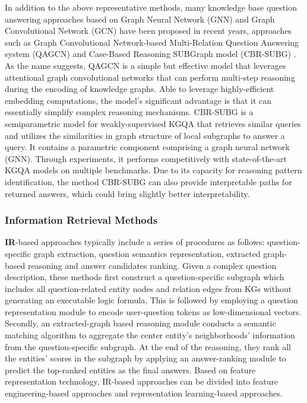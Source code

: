 \documentclass[pdflatex,sn-mathphys]{sn-jnl}%
\theoremstyle{thmstyleone}%
\theoremstyle{thmstyletwo}%
\theoremstyle{thmstylethree}%
\begin{document}
In addition to the above representative methods, many knowledge base question answering approaches based on Graph Neural Network (GNN) \cite{linetal} and Graph Convolutional Network (GCN) \cite{QCNpaper} have been proposed in recent years, approaches such as Graph Convolutional Network-based Multi-Relation Question Answering system (QAGCN) \cite{wangQAGCN} and Case-Based Reasoning SUBGraph model (CBR-SUBG) \cite{pmlrv162das22a}. As the name suggests, QAGCN is a simple but effective model that leverages attentional graph convolutional networks that can perform multi-step reasoning during the encoding of knowledge graphs. Able to leverage highly-efficient embedding computations, the model's significant advantage is that it can essentially simplify complex reasoning mechanisms. CBR-SUBG is a semiparametric model for weakly-supervised KGQA that retrieves similar queries and utilizes the similarities in graph structure of local subgraphs to answer a query. It contains a parametric component comprising a graph neural network (GNN). Through experiments, it performs competitively with state-of-the-art KGQA models on multiple benchmarks. Due to its capacity for reasoning pattern identification, the method CBR-SUBG can also provide interpretable paths for returned answers, which could bring slightly better interpretability.


\subsubsection{Information Retrieval Methods} \textbf{IR}-based approaches typically include a series of procedures as follows: question-specific graph extraction, question semantics representation, extracted graph-based reasoning and answer candidates ranking. Given a complex question description, these methods \cite{chen2019uhopKGQA,jain2016fmnKGQA} first construct a question-specific subgraph which includes all question-related entity nodes and relation edges from KGs without generating an executable logic formula, This is followed by employing a question representation module to encode user-question tokens as low-dimensional vectors. Secondly, an extracted-graph based reasoning module conducts a semantic matching algorithm to aggregate the center entity's neighborhoods' information from the question-specific subgraph. At the end of the reasoning, they rank all the entities' scores in the subgraph by applying an answer-ranking module to predict the top-ranked entities as the final answers. Based on feature representation technology, IR-based approaches can be divided into feature engineering-based approaches and representation learning-based approaches. 
\end{document}
